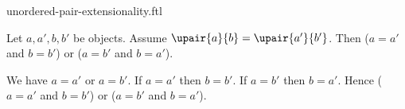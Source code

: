 \documentclass{article}
\begin{document}
\begin{smodule}[creators={Marcel Schütz}]{unordered-pair-extensionality.ftl}

  \begin{fproposition*}[label=6125259604361216]
    Let $a, a', b, b'$ be objects.
    Assume $\upair{a}{b} = \upair{a'}{b'}$.
    Then ($a = a'$ and $b = b'$) or ($a = b'$ and $b = a'$).
  \end{fproposition*}
  \begin{fproof}
    We have $a = a'$ or $a = b'$.
    If $a = a'$ then $b = b'$.
    If $a = b'$ then $b = a'$.
    Hence ($a = a'$ and $b = b'$) or ($a = b'$ and $b = a'$).
  \end{fproof}
\end{smodule}
\end{document}
